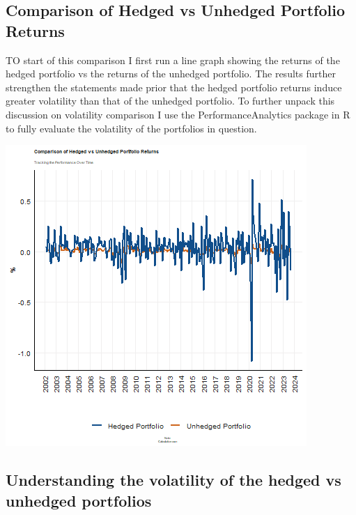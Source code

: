 \documentclass[11pt,preprint, authoryear]{elsarticle}
\let\origfigure\figure
\let\endorigfigure\endfigure
\renewenvironment{figure}[1][2] {
    \expandafter\origfigure\expandafter[H]
} {
    \endorigfigure
}
\numberwithin{equation}{section}
\numberwithin{figure}{section}
\numberwithin{table}{section}
\begin{document}
\hypertarget{comparison-of-hedged-vs-unhedged-portfolio-returns}{%
\subsection{Comparison of Hedged vs Unhedged Portfolio
Returns}\label{comparison-of-hedged-vs-unhedged-portfolio-returns}}

TO start of this comparison I first run a line graph showing the returns
of the hedged portfolio vs the returns of the unhedged portfolio. The
results further strengthen the statements made prior that the hedged
portfolio returns induce greater volatility than that of the unhedged
portfolio. To further unpack this discussion on volatility comparison I
use the PerformanceAnalytics package in R to fully evaluate the
volatility of the portfolios in question.

\begin{figure}[H]

{\centering \includegraphics{Question-2_files/figure-latex/Figure 3-1} 

}

\caption{hedging comparisson plot \label{Figure3}}\label{fig:Figure 3}
\end{figure}

\hypertarget{understanding-the-volatility-of-the-hedged-vs-unhedged-portfolios}{%
\subsection{Understanding the volatility of the hedged vs unhedged
portfolios}\label{understanding-the-volatility-of-the-hedged-vs-unhedged-portfolios}}
\end{document}
